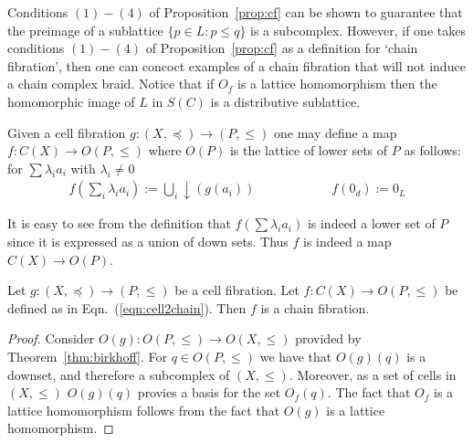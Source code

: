 
Conditions $(1)-(4)$ of Proposition~\ref{prop:cf} can be shown to guarantee that the preimage of a sublattice $\{p\in L: p \leq q\}$ is a subcomplex.  However, if one takes conditions $(1)-(4)$ of Proposition~\ref{prop:cf} as a definition for `chain fibration', then one can concoct examples of a chain fibration that will not induce a chain complex braid.  Notice that if $O_f$ is a lattice homomorphism then the homomorphic image of $L$ in $S(C)$ is a distributive sublattice.


Given a cell fibration $g:(X,\preceq)\to (P,\leq)$ one may define a map $f:C(X)\to O(P,\leq)$ where $O(P)$ is the lattice of lower sets of $P$ as follows: for $\sum \lambda_i a_i$ with $\lambda_i\neq 0$
\begin{align} \label{eqn:cell2chain}
f(\sum_i \lambda_i a_i):= \bigcup_i \downarrow (g(a_i))\quad\quad\quad\quad\quad\quad
f(0_d):= 0_L
\end{align}

It is easy to see from the definition that $f(\sum \lambda_i a_i)$ is indeed a lower set of $P$ since it is expressed as a union of down sets.  Thus $f$ is indeed a map $C(X)\to O(P)$.

\begin{prop}
Let $g:(X,\preceq)\to (P,\leq)$ be a cell fibration.  Let $f:C(X)\to O(P,\leq)$ be defined as in Eqn.~(\ref{eqn:cell2chain}).  Then $f$ is a chain fibration.
\end{prop}
\begin{proof}
Consider $O(g):O(P,\leq)\to O(X,\leq)$ provided by Theorem~\ref{thm:birkhoff}. For $q\in O(P,\leq)$ we have that $O(g)(q)$ is a downset, and therefore a subcomplex of $(X,\leq)$.  Moreover, as a set of cells in $(X,\leq)$ $O(g)(q)$ provies a basis for the set $O_f(q)$.  The fact that $O_f$ is a lattice homomorphism follows from the fact that $O(g)$ is a lattice homomorphism.

\end{proof}

